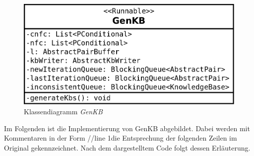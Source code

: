 \documentclass[12pt,a4paper]{article}
\begin{document}
\begin{figure}
\includegraphics[width=0.5\linewidth]{bilder/genkb.png}
\caption{Klassendiagramm \textit{GenKB}}
\label{pic:genkb}
\end{figure}



Im Folgenden ist die Implementierung von GenKB abgebildet. Dabei werden mit Kommentaren in der Form \glqq //line 1\grqq \space die Entsprechung der folgenden Zeilen im Original gekennzeichnet. Nach dem dargestelltem Code folgt dessen Erläuterung. \\
\end{document}
